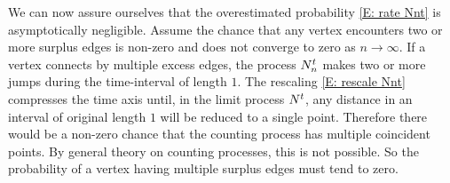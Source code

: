 \newpage
We can now assure ourselves that the overestimated probability \eqref{E: rate Nnt} is asymptotically negligible.
Assume the chance that any vertex encounters two or more surplus edges is non-zero and does not converge to zero as $n \rightarrow \infty$.
If a vertex connects by multiple excess edges, the process $N_n^t$ makes two or more jumps during the time-interval of length $1$.
The rescaling \eqref{E: rescale Nnt} compresses the time axis until, in the limit process $N^t$, 
any distance in an interval of original length $1$ will be reduced to a single point.
Therefore there would be a non-zero chance that the counting process has multiple coincident points.
By general theory on counting processes, this is not possible.
So the probability of a vertex having multiple surplus edges must tend to zero.

















